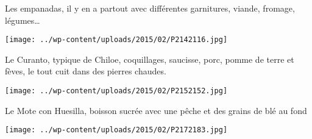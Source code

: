  Les empanadas, il y en a partout avec différentes garnitures, viande, fromage, légumes…

 

\begin{center} \texttt{[image: ../wp-content/uploads/2015/02/P2142116.jpg]} \end{center}



 Le Curanto, typique de Chiloe, coquillages, saucisse, porc, pomme de terre et fèves, le tout cuit dans des pierres chaudes.

 

\begin{center} \texttt{[image: ../wp-content/uploads/2015/02/P2152152.jpg]} \end{center}



 Le Mote con Huesilla, boisson sucrée avec une pêche et des grains de blé au fond

 

\begin{center} \texttt{[image: ../wp-content/uploads/2015/02/P2172183.jpg]} \end{center}




 
 
